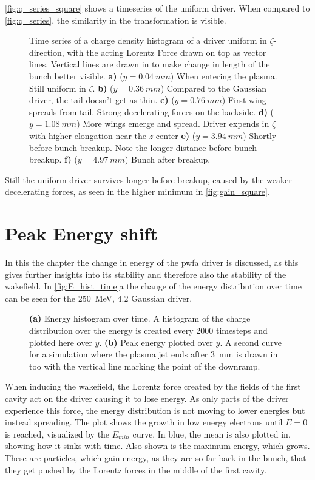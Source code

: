 \documentclass[bachelor_thesis]{subfiles}
\begin{document}
\autoref{fig:q_series_square} shows a timeseries of the uniform driver. When compared to \autoref{fig:q_series}, the similarity in the transformation is visible.
\begin{figure}
	\centering
	\missingfigure{}
	\caption{Time series of a charge density histogram of a driver uniform in $\zeta$-direction, with the acting Lorentz Force drawn on top as vector lines. Vertical lines are drawn in to make change in length of the bunch better visible. 
	\textbf{a)} ($y=\qty{0.04}{mm}$) When entering the plasma. Still uniform in $\zeta$.
	\textbf{b)} ($y=\qty{0.36}{mm}$) Compared to the Gaussian driver, the tail doesn't get as thin.
	\textbf{c)} ($y=\qty{0.76}{mm}$) First wing spreads from tail. Strong decelerating forces on the backside.
	\textbf{d)} ($y=\qty{1.08}{mm}$) More wings emerge and spread. Driver expends in $\zeta$ with higher elongation near the $z$-center
	\textbf{e)} ($y=\qty{3.94}{mm}$) Shortly before bunch breakup. Note the longer distance before bunch breakup.
	\textbf{f)} ($y=\qty{4.97}{mm}$) Bunch after breakup.}
	\label{fig:q_series_square}
\end{figure}
Still the uniform driver survives longer before breakup, caused by the weaker decelerating forces, as seen in the higher minimum in \autoref{fig:gain_square}.


\section{Peak Energy shift} \label{chap:E_shift}
In this the chapter the change in energy of the \gls{pwfa} driver is discussed, as this gives further insights into its stability and therefore also the stability of the wakefield.
In \autoref{fig:E_hist_time}a the change of the energy distribution over time can be seen for the \qty{250}{\MeV}, \qty{4.2}{\mrad} Gaussian driver.
\begin{figure}
	\centering
	\missingfigure{}
	\caption{
	\textbf{(a)} Energy histogram over time. A histogram of the charge distribution over the energy is created every 2000 timesteps and plotted here over $y$.
	\textbf{(b)} Peak energy plotted over $y$. A second curve for a simulation where the plasma jet ends after \qty{3}{\mm} is drawn in too with the vertical line marking the point of the downramp.}
	\label{fig:E_hist_time}
\end{figure}
When inducing the wakefield, the Lorentz force created by the fields of the first cavity act on the driver causing it to lose energy. As only parts of the driver experience this force, the energy distribution is not moving to lower energies but instead spreading.
The plot shows the growth in low energy electrons until $E=0$ is reached, visualized by the $E_{min}$ curve. In blue, the mean is also plotted in, showing how it sinks with time. Also shown is the maximum energy, which grows.
These are particles, which gain energy, as they are so far back in the bunch, that they get pushed by the Lorentz forces in the middle of the first cavity.
\end{document}
